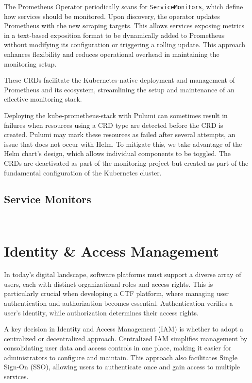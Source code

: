The Prometheus Operator periodically scans for \texttt{ServiceMonitors}, which define how services should be monitored. Upon discovery, the operator updates Prometheus with the new scraping targets. This allows services exposing metrics in a text-based exposition format to be dynamically added to Prometheus without modifying its configuration or triggering a rolling update. This approach enhances flexibility and reduces operational overhead in maintaining the monitoring setup.

These CRDs facilitate the Kubernetes-native deployment and management of Prometheus and its ecosystem, streamlining the setup and maintenance of an effective monitoring stack.

Deploying the kube-prometheus-stack with Pulumi can sometimes result in failures when resources using a CRD type are detected before the CRD is created. Pulumi may mark these resources as failed after several attempts, an issue that does not occur with Helm. To mitigate this, we take advantage of the Helm chart's design, which allows individual components to be toggled. The CRDs are deactivated as part of the monitoring project but created as part of the fundamental configuration of the Kubernetes cluster.

\section{Service Monitors}

\begin{verbatim}
    
\end{verbatim}

\chapter{Identity \& Access Management}
In today's digital landscape, software platforms must support a diverse array of users, each with distinct organizational roles and access rights. This is particularly crucial when developing a CTF platform, where managing user authentication and authorization becomes essential. Authentication verifies a user's identity, while authorization determines their access rights.

A key decision in Identity and Access Management (IAM) is whether to adopt a centralized or decentralized approach. Centralized IAM simplifies management by consolidating user data and access controls in one place, making it easier for administrators to configure and maintain. This approach also facilitates Single Sign-On (SSO), allowing users to authenticate once and gain access to multiple services.

